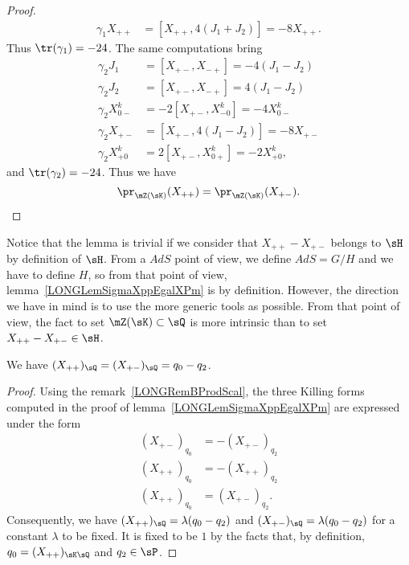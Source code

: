 \begin{proof}
\begin{subequations}
\begin{align}
			\gamma_1X_{++}&=[X_{++},4(J_1+J_2)]=-8X_{++}.
		\end{align}
	\end{subequations}
	Thus $\tr(\gamma_1)=-24$. The same computations bring
	\begin{subequations}
		\begin{align}
			\gamma_2J_1&=[X_{+-},X_{-+}]=-4(J_1-J_2)\\
			\gamma_2J_2&=[X_{+-},X_{-+}]=4(J_1-J_2)\\
			\gamma_2X^k_{0-}&=-2[X_{+-},X^k_{-0}]=-4X^k_{0-}\\
			\gamma_2X_{+-}&=[X_{+-},4(J_1-J_2)]=-8X_{+-}\\
			\gamma_2X^k_{+0}&=2[X_{+-},X^k_{0+}]=-2X^k_{+0},
		\end{align}
	\end{subequations}
	and $\tr(\gamma_2)=-24$. Thus we have
	\begin{equation}
		\pr_{\mZ(\sK)}(X_{++})=\pr_{\mZ(\sK)}(X_{+-}).
	\end{equation}
\end{proof}

Notice that the lemma is trivial if we consider that $X_{++}-X_{+-}$ belongs to $\sH$ by definition of $\sH$. From a $AdS$ point of view, we define $AdS=G/H$ and we have to define $H$, so from that point of view, lemma~\ref{LONGLemSigmaXppEgalXPm} is by definition. However, the direction we have in mind is to use the more generic tools as possible. From that point of view, the fact to set $\mZ(\sK)\subset\sQ$ is more intrinsic than to set $X_{++}-X_{+-}\in\sH$.


\begin{proposition}		\label{LONGPropXmpXppqq}
	We have $(X_{++})_{\sQ}=(X_{+-})_{\sQ}=q_0-q_2$.
\end{proposition}

\begin{proof}
	Using the remark~\ref{LONGRemBProdScal}, the three Killing forms computed in the proof of lemma~\ref{LONGLemSigmaXppEgalXPm} are expressed under the form
	\begin{subequations}
		\begin{align}
			(X_{+-})_{q_0}&=-(X_{+-})_{q_2}\\
			(X_{++})_{q_0}&=-(X_{++})_{q_2}\\
			(X_{++})_{q_0}&=(X_{+-})_{q_2}.
		\end{align}
	\end{subequations}
	Consequently, we have $(X_{++})_{\sQ}=\lambda(q_0-q_2)$ and $(X_{+-})_{\sQ}=\lambda(q_0-q_2)$ for a constant $\lambda$ to be fixed. It is fixed to be $1$ by the facts that, by definition, $q_0=(X_{++})_{\sK\sQ}$ and $q_2\in\sP$.
\end{proof}

